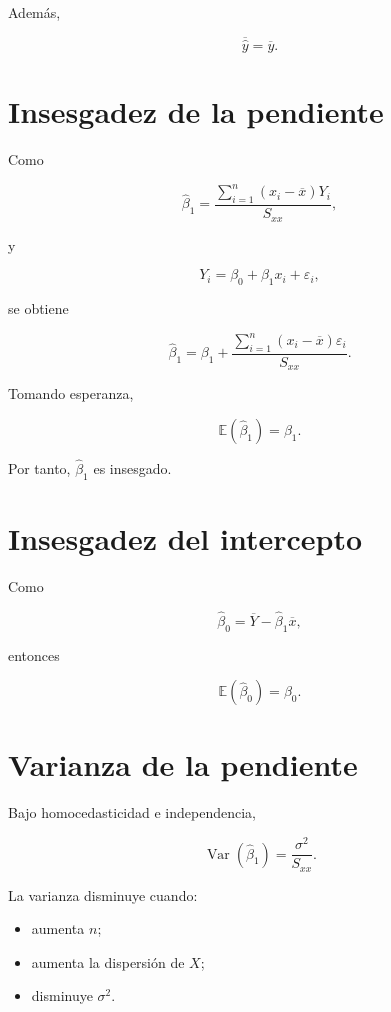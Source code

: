 \documentclass[
  spanish,
  11pt,
  letterpaper,
  DIV=11,
  numbers=noendperiod]{scrreprt}
\providecommand{\tightlist}{%
  \setlength{\itemsep}{0pt}\setlength{\parskip}{0pt}}
\theoremstyle{definition}
\theoremstyle{plain}
\theoremstyle{definition}
\theoremstyle{remark}
\begin{document}
Además,

\[
\overline{\widehat{y}}
=
\overline{y}.
\]

\section{Insesgadez de la pendiente}\label{insesgadez-de-la-pendiente}

Como

\[
\widehat{\beta}_1
=
\frac{
\sum_{i=1}^{n}
(x_i-\overline{x})Y_i
}{
S_{xx}
},
\]

y

\[
Y_i
=
\beta_0+\beta_1x_i+\varepsilon_i,
\]

se obtiene

\[
\widehat{\beta}_1
=
\beta_1
+
\frac{
\sum_{i=1}^{n}
(x_i-\overline{x})\varepsilon_i
}{
S_{xx}
}.
\]

Tomando esperanza,

\[
\mathbb{E}
(
\widehat{\beta}_1
)
=
\beta_1.
\]

Por tanto, \(\widehat{\beta}_1\) es insesgado.

\section{Insesgadez del intercepto}\label{insesgadez-del-intercepto}

Como

\[
\widehat{\beta}_0
=
\overline{Y}
-
\widehat{\beta}_1\overline{x},
\]

entonces

\[
\mathbb{E}
(
\widehat{\beta}_0
)
=
\beta_0.
\]

\section{Varianza de la pendiente}\label{varianza-de-la-pendiente}

Bajo homocedasticidad e independencia,

\[
\operatorname{Var}
(
\widehat{\beta}_1
)
=
\frac{
\sigma^2
}{
S_{xx}
}.
\]

La varianza disminuye cuando:

\begin{itemize}
\tightlist
\item
  aumenta \(n\);
\item
  aumenta la dispersión de \(X\);
\item
  disminuye \(\sigma^2\).
\end{itemize}
\end{document}
